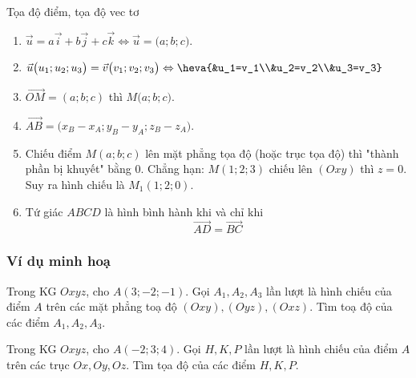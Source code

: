 \begin{dang}{Tọa độ điểm, tọa độ vec tơ}
	\begin{enumerate}
		\item $\vec{u}=a\vec{i}+b\vec{j}+c\vec{k} \Leftrightarrow \vec{u}=\big(a;b;c\big)$.
		\item $\vec{u}\big(u_1;u_2;u_3\big)=\vec{v}\big(v_1;v_2;v_3\big) \Leftrightarrow \heva{&u_1=v_1\\&u_2=v_2\\&u_3=v_3}$
		\item $\vec{OM}=(a;b;c)$ thì $M\big(a;b;c\big)$.
		\item $\vec{AB}=\big(x_B-x_A;y_B-y_A;z_B-z_A \big).$
		\item Chiếu điểm $M(a;b;c)$ lên mặt phẳng tọa độ (hoặc trục tọa độ) thì "thành phần bị khuyết" bằng $0$. Chẳng hạn: $M(1;2;3)$ chiếu lên $(Oxy)$ thì $z=0$. Suy ra hình chiếu là $M_1(1;2;0)$.
		\item Tứ giác $ABCD$ là hình bình hành khi và chỉ khi $$\vec{AD}=\vec{BC}$$
	\end{enumerate}
\end{dang}
\subsubsection{Ví dụ minh hoạ}
\begin{vd}
	Trong KG $Oxyz$, cho $A(3 ;-2 ;-1)$. Gọi $ A_1, A_2, A_3$ lần lượt là hình chiếu của điểm $A$ trên các mặt phẳng toạ độ $(Oxy),(Oyz),(Oxz)$. Tìm toạ độ của các điểm $ A_1, A_2, A_3$.
\end{vd}

\begin{vd}
	Trong KG $Oxyz$, cho $A(-2;3;4)$. Gọi $H, K, P$ lần lượt là hình chiếu của điểm $A$ trên các trục $Ox, Oy, Oz$. Tìm tọa độ của các điểm $H,K,P$.
\end{vd}

